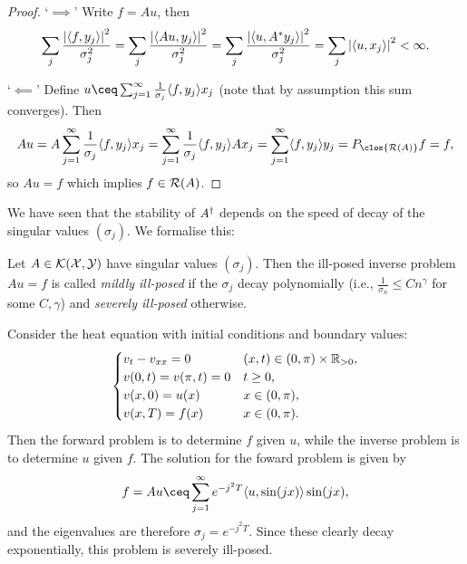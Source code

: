 \begin{proof}
    `$\implies$' Write $f = Au$, then
    \[
    \sum_j \frac{\abs{\langle f, y_j\rangle}^2}{\sigma_j^2} = \sum_j \frac{\abs{\langle Au, y_j\rangle}^2}{\sigma_j^2} = \sum_j \frac{\abs{\langle u, A^* y_j\rangle}^2}{\sigma_j^2} = \sum_j \abs{\langle u, x_j\rangle}^2 < \infty. 
    \]
    
    `$\impliedby$' Define $u \ceq  \sum_{j=1}^\infty \frac{1}{\sigma_j} \ang{f, y_j} x_j$ (note that by assumption this sum converges). Then 
    \[
    Au = A \sum_{j=1}^\infty \frac{1}{\sigma_j} \ang{f, y_j} x_j = \sum_{j=1}^\infty \frac{1}{\sigma_j} \ang{f, y_j} Ax_j = \sum_{j=1}^\infty \ang{f, y_j} y_j = P_{\clos{\Ran(A)}} f = f,
    \]
    so $Au = f$ which implies $f \in \operatorname{\mathcal R}(A)$. 
\end{proof}

We have seen that the stability of $A^\dagger$ depends on the speed of decay of the singular values $(\sigma_j)$. We formalise this:
\begin{definition}
    Let $A \in \mathcal K(\mathcal X, \mathcal Y)$ have singular values $(\sigma_j)$. Then the ill-posed inverse problem $Au = f$ is called \emph{mildly ill-posed} if the $\sigma_j$ decay polynomially (i.e., $\frac{1}{\sigma_n} \leq C n^\gamma$ for some $C, \gamma$) and \emph{severely ill-posed} otherwise. 
\end{definition}

\begin{example}
    Consider the heat equation with initial conditions and boundary values:
    \[
    \begin{cases}
        v_t - v_{xx} = 0 &(x, t) \in (0, \pi) \times \mathbb R_{>0}, \\
        v(0, t) = v(\pi, t) = 0 &t \geq 0, \\
        v(x, 0) = u(x) &x \in (0, \pi), \\
        v(x, T) = f(x) &x \in (0, \pi). 
    \end{cases}
    \]
    Then the forward problem is to determine $f$ given $u$, while the inverse problem is to determine $u$ given $f$. The solution for the foward problem is given by
    \[
    f = Au \ceq \sum_{j=1}^\infty e^{-j^2T} \ang{u, \sin(jx)}  \sin(jx), 
    \]
    and the eigenvalues are therefore $\sigma_j = e^{-j^2T}$. Since these clearly decay exponentially, this problem is severely ill-posed. 
\end{example}